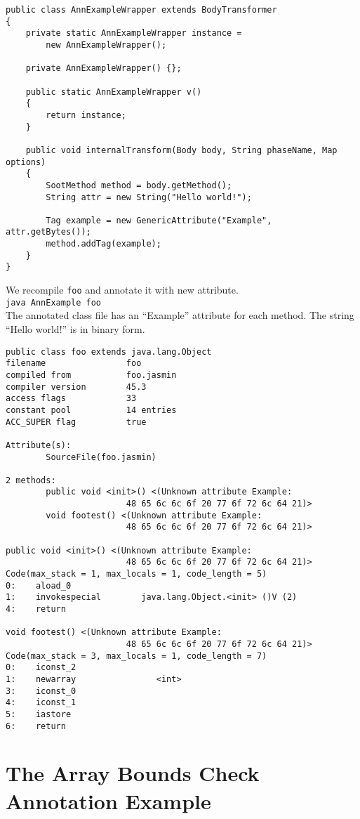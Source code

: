 \documentclass{article}
\begin{document}
\begin{verbatim}
public class AnnExampleWrapper extends BodyTransformer
{
    private static AnnExampleWrapper instance =
        new AnnExampleWrapper();

    private AnnExampleWrapper() {};

    public static AnnExampleWrapper v()
    {
        return instance;
    }

    public void internalTransform(Body body, String phaseName, Map options)
    {
        SootMethod method = body.getMethod();
        String attr = new String("Hello world!");
        
        Tag example = new GenericAttribute("Example", attr.getBytes());
        method.addTag(example);
    }
}
\end{verbatim}

We recompile {\tt foo} and annotate it with new attribute.\\
{\tt java AnnExample foo}\\ 
The annotated class file has an ``Example'' attribute for each method.
The string ``Hello world!'' is in binary form.

\begin{verbatim}
public class foo extends java.lang.Object
filename                foo
compiled from           foo.jasmin
compiler version        45.3
access flags            33
constant pool           14 entries
ACC_SUPER flag          true

Attribute(s):
        SourceFile(foo.jasmin)

2 methods:
        public void <init>() <(Unknown attribute Example: 
                        48 65 6c 6c 6f 20 77 6f 72 6c 64 21)>
        void footest() <(Unknown attribute Example: 
                        48 65 6c 6c 6f 20 77 6f 72 6c 64 21)>

public void <init>() <(Unknown attribute Example: 
                        48 65 6c 6c 6f 20 77 6f 72 6c 64 21)>
Code(max_stack = 1, max_locals = 1, code_length = 5)
0:    aload_0
1:    invokespecial        java.lang.Object.<init> ()V (2)
4:    return

void footest() <(Unknown attribute Example: 
                        48 65 6c 6c 6f 20 77 6f 72 6c 64 21)>
Code(max_stack = 3, max_locals = 1, code_length = 7)
0:    iconst_2
1:    newarray                <int>
3:    iconst_0
4:    iconst_1
5:    iastore
6:    return
\end{verbatim}

\section{The Array Bounds Check Annotation Example}
\end{document}
